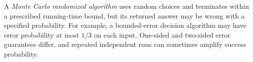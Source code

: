 
A \emph{Monte Carlo randomized algorithm} uses random choices and terminates within a prescribed running-time bound, but its returned answer may be wrong with a specified probability. For example, a bounded-error decision algorithm may have error probability at most $1/3$ on each input. One-sided and two-sided error guarantees differ, and repeated independent runs can sometimes amplify success probability.
